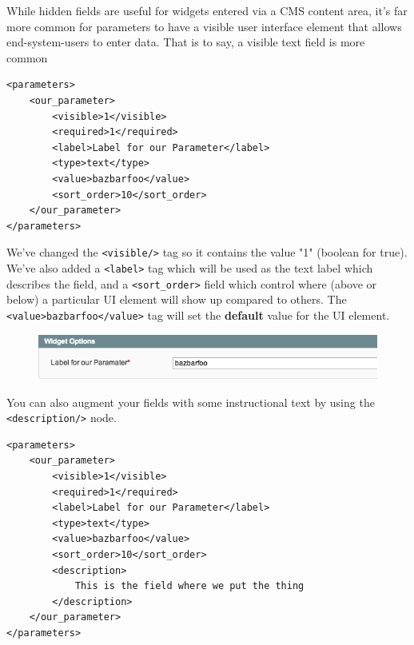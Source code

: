 \documentclass[oneside]{book}
\begin{document}
While hidden fields are useful for widgets entered via a CMS content area, it's  far more common for parameters to have a visible user interface element that  allows end-system-users to enter data.  That is to say, a visible text field is more common

\begin{lstlisting}
<parameters>
    <our_parameter>
        <visible>1</visible>
        <required>1</required>
        <label>Label for our Parameter</label>
        <type>text</type>
        <value>bazbarfoo</value>
        <sort_order>10</sort_order>
    </our_parameter>
</parameters>

\end{lstlisting}


We've changed the \footnotesize\texttt{\textless visible/\textgreater } \normalsize  tag so it contains the value "1" (boolean for true).  We've also added a \footnotesize\texttt{\textless label\textgreater } \normalsize  tag which will be used as the text label which describes the field, and a \footnotesize\texttt{\textless sort\_order\textgreater } \normalsize  field which control where (above or below) a particular UI element will show up compared to others.  The \footnotesize\texttt{\textless value\textgreater bazbarfoo\textless /value\textgreater } \normalsize  tag will set the \textbf{default} value for the UI element.  

\begin{figure}[htb]
\begin{center}
\leavevmode
\includegraphics[width=1\textwidth]{images/appendix_g/field.png}
\end{center}
\caption{}
\end{figure}


You can also augment your fields with some instructional text by using the \footnotesize\texttt{\textless description/\textgreater } \normalsize  node.  

\begin{lstlisting}
<parameters>
    <our_parameter>
        <visible>1</visible>
        <required>1</required>
        <label>Label for our Parameter</label>
        <type>text</type>
        <value>bazbarfoo</value>
        <sort_order>10</sort_order>
        <description>
            This is the field where we put the thing
        </description>
    </our_parameter>
</parameters>

\end{lstlisting}
\end{document}
